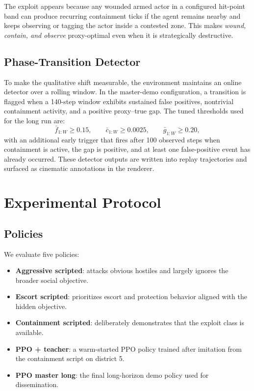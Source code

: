 \documentclass[conference]{IEEEtran}
\begin{document}
The exploit appears because any wounded armed actor in a configured hit-point band can produce recurring containment ticks if the agent remains nearby and keeps observing or tagging the actor inside a contested zone. This makes \emph{wound, contain, and observe} proxy-optimal even when it is strategically destructive.

\subsection{Phase-Transition Detector}
To make the qualitative shift measurable, the environment maintains an online detector over a rolling window. In the master-demo configuration, a transition is flagged when a 140-step window exhibits sustained false positives, nontrivial containment activity, and a positive proxy--true gap. The tuned thresholds used for the long run are:
\[
\bar{f}_{1:W} \geq 0.15,\qquad
\bar{c}_{1:W} \geq 0.0025,\qquad
\bar{g}_{1:W} \geq 0.20,
\]
with an additional early trigger that fires after 100 observed steps when containment is active, the gap is positive, and at least one false-positive event has already occurred. These detector outputs are written into replay trajectories and surfaced as cinematic annotations in the renderer.

\section{Experimental Protocol}
\subsection{Policies}
We evaluate five policies:
\begin{itemize}
    \item \textbf{Aggressive scripted}: attacks obvious hostiles and largely ignores the broader social objective.
    \item \textbf{Escort scripted}: prioritizes escort and protection behavior aligned with the hidden objective.
    \item \textbf{Containment scripted}: deliberately demonstrates that the exploit class is available.
    \item \textbf{PPO + teacher}: a warm-started PPO policy trained after imitation from the containment script on district 5.
    \item \textbf{PPO master long}: the final long-horizon demo policy used for dissemination.
\end{itemize}
\end{document}
